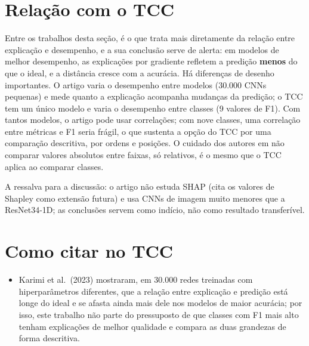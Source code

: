 \documentclass[11pt,a4paper]{article}
\begin{document}
\section{Relação com o TCC}
Entre os trabalhos desta seção, é o que trata mais diretamente da relação entre explicação e desempenho, e a sua conclusão serve de alerta: em modelos de melhor desempenho, as explicações por gradiente refletem a predição \textbf{menos} do que o ideal, e a distância cresce com a acurácia. Há diferenças de desenho importantes. O artigo varia o desempenho entre modelos (30.000 CNNs pequenas) e mede quanto a explicação acompanha mudanças da predição; o TCC tem um único modelo e varia o desempenho entre classes (9 valores de F1). Com tantos modelos, o artigo pode usar correlações; com nove classes, uma correlação entre métricas e F1 seria frágil, o que sustenta a opção do TCC por uma comparação descritiva, por ordens e posições. O cuidado dos autores em não comparar valores absolutos entre faixas, só relativos, é o mesmo que o TCC aplica ao comparar classes.

A ressalva para a discussão: o artigo não estuda SHAP (cita os valores de Shapley como extensão futura) e usa CNNs de imagem muito menores que a ResNet34-1D; as conclusões servem como indício, não como resultado transferível.

\section{Como citar no TCC}
\begin{itemize}
  \item Karimi et al.\ (2023) mostraram, em 30.000 redes treinadas com hiperparâmetros diferentes, que a relação entre explicação e predição está longe do ideal e se afasta ainda mais dele nos modelos de maior acurácia; por isso, este trabalho não parte do pressuposto de que classes com F1 mais alto tenham explicações de melhor qualidade e compara as duas grandezas de forma descritiva.
\end{itemize}
\end{document}
